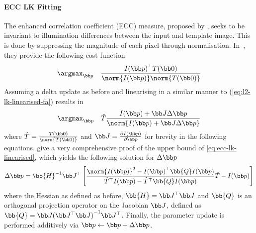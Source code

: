 \paragraph{ECC LK Fitting}\label{subsubsec:lk-ecc}
The enhanced correlation coefficient (ECC) measure, proposed by
\citet{evangelidis2008parametric}, seeks to be invariant to illumination differences
between the input and template image. This is done by suppressing the magnitude
of each pixel through normalisation. In~\cite{evangelidis2008parametric}, they provide the
following cost function
\begin{equation}\label{eq:ecc-lk-max}
   \argmax_{\p} \quad \frac{{I(\p)}^{\top} T(\zero)}{\norm{I(\p)} \norm{T(\zero)}}
\end{equation}
Assuming a delta update as before and linearising in a similar manner to
(\ref{eq:l2-lk-linearised-fa}) results in
\begin{equation}\label{eq:ecc-lk-linearised}
    \argmax_{\p} \quad \hat{T} \frac{I(\p) + \J \Delta \p}{\norm{{I(\p) + \J \Delta \p}}}
\end{equation}
where $\hat{T} = \frac{T(\zero)}{\norm{T(\zero)}}$ and
$\J = \frac{\partial I(\p)}{\partial \p}$ for brevity in the following equations.
\citet{evangelidis2008parametric} give a very comprehensive proof of
the upper bound of \cref{eq:ecc-lk-linearised}, which yields the
following solution for $\Delta \p$
\begin{equation}\label{eq:ecc-lk-gauss-newton-fa}
    \Delta \p = \bb{H}^{-1} \J^{\top} \left[ \frac{\norm{I(\p)}^2 - {I(\p)}^{\top} \bb{Q} I(\p)}{\hat{T}^{\top} I(\p) - \hat{T}^{\top} \bb{Q} I(\p)} \hat{T} - I(\p) \right]
\end{equation}
where the Hessian as defined as before, $\bb{H} = \J^{\top} \J$ and $\bb{Q}$ is
an orthogonal projection operator on the Jacobian $\J$,
defined as $\bb{Q} = \J {(\J^\top \J)}^{-1} \J^\top$. Finally, the
parameter update is performed additively via $\p \leftarrow \p + \Delta \p$.

